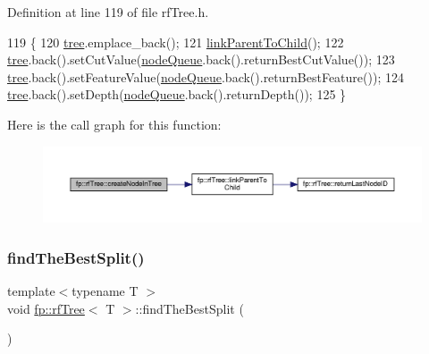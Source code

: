 Definition at line 119 of file rf\+Tree.\+h.


\begin{DoxyCode}
119                                               \{
120                     \hyperlink{classtree}{tree}.emplace\_back();
121                     \hyperlink{classfp_1_1rfTree_aceaedc5d54bb429c1a3539f164a93d45}{linkParentToChild}();
122                     \hyperlink{classtree}{tree}.back().setCutValue(\hyperlink{classfp_1_1rfTree_af72d0a2f930fd480dfb4858885c2df23}{nodeQueue}.back().returnBestCutValue());
123                     \hyperlink{classtree}{tree}.back().setFeatureValue(\hyperlink{classfp_1_1rfTree_af72d0a2f930fd480dfb4858885c2df23}{nodeQueue}.back().returnBestFeature());
124                     \hyperlink{classtree}{tree}.back().setDepth(\hyperlink{classfp_1_1rfTree_af72d0a2f930fd480dfb4858885c2df23}{nodeQueue}.back().returnDepth());
125                 \}
\end{DoxyCode}
Here is the call graph for this function\+:
\nopagebreak
\begin{figure}[H]
\begin{center}
\leavevmode
\includegraphics[width=350pt]{classfp_1_1rfTree_aaf9d8cdfbb1d10da53a375ea8204e393_cgraph}
\end{center}
\end{figure}
\mbox{\label{classfp_1_1rfTree_a51da8e4a46582b26643a4ae392230e77}} 
\subsubsection{\texorpdfstring{find\+The\+Best\+Split()}{findTheBestSplit()}\hspace{0.1cm}{\footnotesize\ttfamily [1/2]}}
{\footnotesize\ttfamily template$<$typename T $>$ \\
void \hyperlink{classfp_1_1rfTree}{fp\+::rf\+Tree}$<$ T $>$\+::find\+The\+Best\+Split (\begin{DoxyParamCaption}{ }\end{DoxyParamCaption})\hspace{0.3cm}{\ttfamily [inline]}}



